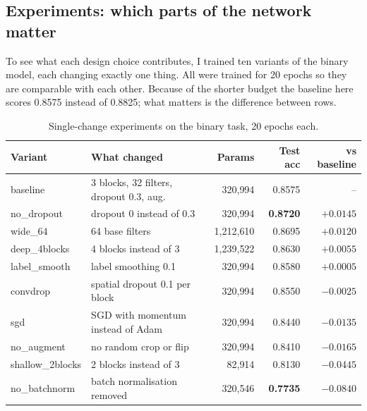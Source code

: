 \documentclass[11pt,a4paper]{article}
\begin{document}
\subsection{Experiments: which parts of the network matter}\label{sec:cls_exp}

To see what each design choice contributes, I trained ten variants of the binary
model, each changing exactly one thing. All were trained for 20 epochs so they
are comparable with each other. Because of the shorter budget the baseline here
scores 0.8575 instead of 0.8825; what matters is the difference between rows.

\begin{table}[H]
\centering\small
\begin{tabular}{llrrr}
\toprule
\textbf{Variant} & \textbf{What changed} & \textbf{Params}
& \textbf{Test acc} & \textbf{vs baseline} \\
\midrule
baseline         & 3 blocks, 32 filters, dropout 0.3, aug. & 320{,}994 & 0.8575 & -- \\
no\_dropout      & dropout 0 instead of 0.3        & 320{,}994   & \textbf{0.8720} & $+0.0145$ \\
wide\_64         & 64 base filters                 & 1{,}212{,}610 & 0.8695 & $+0.0120$ \\
deep\_4blocks    & 4 blocks instead of 3           & 1{,}239{,}522 & 0.8630 & $+0.0055$ \\
label\_smooth    & label smoothing 0.1             & 320{,}994   & 0.8580 & $+0.0005$ \\
convdrop         & spatial dropout 0.1 per block   & 320{,}994   & 0.8550 & $-0.0025$ \\
sgd              & SGD with momentum instead of Adam & 320{,}994 & 0.8440 & $-0.0135$ \\
no\_augment      & no random crop or flip          & 320{,}994   & 0.8410 & $-0.0165$ \\
shallow\_2blocks & 2 blocks instead of 3           & 82{,}914    & 0.8130 & $-0.0445$ \\
no\_batchnorm    & batch normalisation removed     & 320{,}546   & \textbf{0.7735} & $\mathbf{-0.0840}$ \\
\bottomrule
\end{tabular}
\caption{Single-change experiments on the binary task, 20 epochs each.}
\label{tab:cls_exp}
\end{table}
\end{document}
